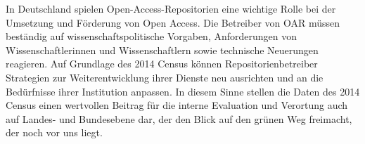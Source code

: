 \documentclass[a4paper,
fontsize=11pt,
oneside,
numbers=noperiodatend,
parskip=half-,
bibliography=totoc,
final
]{scrartcl}
\begin{document}
In Deutschland spielen Open-Access-Repositorien eine wichtige Rolle bei
der Umsetzung und Förderung von Open Access. Die Betreiber von OAR
müssen beständig auf wissenschaftspolitische Vorgaben, Anforderungen von
Wissenschaftlerinnen und Wissenschaftlern sowie technische Neuerungen
reagieren. Auf Grundlage des 2014 Census können Repositorienbetreiber
Strategien zur Weiterentwicklung ihrer Dienste neu ausrichten und an die
Bedürfnisse ihrer Institution anpassen. In diesem Sinne stellen die
Daten des 2014 Census einen wertvollen Beitrag für die interne
Evaluation und Verortung auch auf Landes- und Bundesebene dar, der den
Blick auf den grünen Weg freimacht, der noch vor uns liegt.

\end{document}
